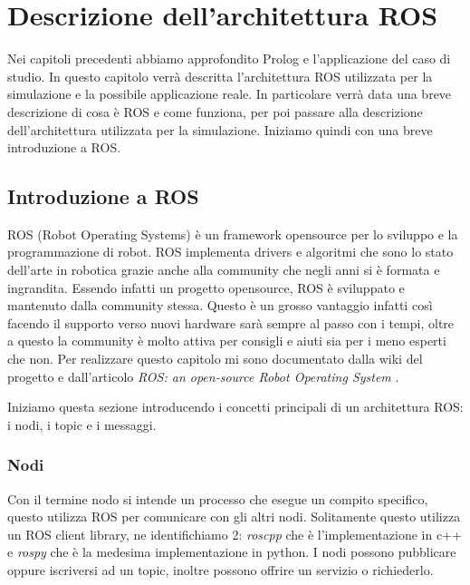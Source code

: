 \chapter{Descrizione dell'architettura ROS}
\label{cha:descrizionearchros}
Nei capitoli precedenti abbiamo approfondito Prolog e l'applicazione del caso di studio. In questo capitolo verrà descritta l'architettura ROS utilizzata per la simulazione e la possibile applicazione reale.
In particolare verrà data una breve descrizione di cosa è ROS e come funziona, per poi passare alla descrizione dell'architettura utilizzata per la simulazione. Iniziamo quindi con una breve introduzione a ROS.

\section{Introduzione a ROS}
\label{sec:introduzione_ros}
ROS (Robot Operating Systems) è un framework opensource per lo sviluppo e la programmazione di robot. ROS implementa drivers e algoritmi che sono lo stato dell'arte in robotica grazie anche alla community che negli anni si è formata e ingrandita.
Essendo infatti un progetto opensource, ROS è sviluppato e mantenuto dalla community stessa. Questo è un grosso vantaggio infatti così facendo il supporto verso nuovi hardware sarà sempre al passo con i tempi, oltre a questo la community è molto attiva per consigli e aiuti sia per i meno esperti che non.
Per realizzare questo capitolo mi sono documentato dalla wiki del progetto \cite{rossite} e dall'articolo \textit{ROS: an open-source Robot Operating System} \cite{quingley2009ros}.

Iniziamo questa sezione introducendo i concetti principali di un architettura ROS: i nodi, i topic e i messaggi.

\subsection{Nodi}
\label{subsec:nodi}
Con il termine nodo si intende un processo che esegue un compito specifico, questo utilizza ROS per comunicare con gli altri nodi. Solitamente questo utilizza un ROS client library, ne identifichiamo 2: \textit{roscpp} che è l'implementazione in c++ e \textit{rospy} che è la medesima implementazione in python. I nodi possono pubblicare oppure iscriversi ad un topic, inoltre possono offrire un servizio o richiederlo. 

